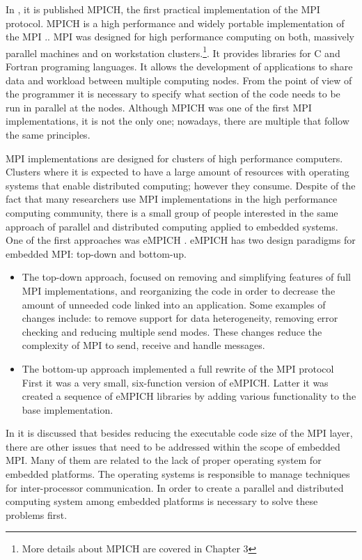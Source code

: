 
In \cite{Salim}, it is published MPICH,  the first practical implementation of
the MPI protocol. MPICH is a high performance and widely portable
implementation of the MPI .\cite{Gropp}. MPI was designed for high performance
computing on both, massively parallel machines and on workstation
clusters.\footnote{More details about MPICH are covered in Chapter 3}. It
provides libraries for C and Fortran programing languages. It allows the
development of applications to share data and workload between multiple
computing nodes. From the point of view of the programmer it is necessary to
specify what section of the code needs to be run in parallel at the nodes.
Although MPICH was one of the first MPI implementations, it is not the only
one; nowadays, there are multiple that follow the same principles.


MPI implementations are designed for clusters of high performance
computers. Clusters where it is expected to have a large amount of resources
with operating systems that enable distributed computing; however they consume.
Despite of the fact that many researchers use MPI implementations in the high performance
computing community, there is a small group of people interested in the same
approach of parallel and distributed computing applied to embedded systems. One
of the first approaches was eMPICH \cite{McMahon}. eMPICH has two design
paradigms for embedded MPI: top-down and bottom-up.

\begin{itemize}
\item The top-down approach, focused on removing and simplifying
features of full MPI implementations, and reorganizing the code in order to
decrease the amount of unneeded code linked into an application. Some examples
of changes include: to remove support for data heterogeneity, removing error
checking and reducing multiple send modes. These changes reduce the
complexity of MPI to send, receive and handle messages.

\item The bottom-up approach implemented a full rewrite of the MPI protocol
First it was a very small, six-function version of eMPICH. Latter it was
created a sequence of eMPICH libraries by adding various functionality to the
base implementation.
\end{itemize}

In \cite{McMahon} it is discussed that besides reducing the executable
code size of the MPI layer, there are other issues that need
to be addressed within the scope of embedded MPI. Many of them are related to
the lack of proper operating system for embedded platforms. The operating
systems is responsible to manage techniques for inter-processor
communication. In order to create a parallel and distributed computing system
among embedded platforms is necessary to solve these problems first.

